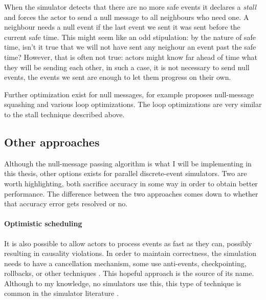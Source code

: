When the simulator detects that there are no more safe events it declares a \emph{stall} and forces the actor to send a null message to all neighbours who need one.
A neighbour needs a null event if the last event we sent it was sent before the current safe time.
This might seem like an odd stipulation: by the nature of safe time, isn't it true that we will not have sent any neighour an event past the safe time?
However, that is often not true: actors might know  far ahead of time what they will be sending each other, in such a case, it is not necessary to send null events, the events we sent are enough to let them progress on their own.

Further optimization exist for null messages, for example \cite{wang_enhanced_2016} proposes null-message squashing and various loop optimizations.
The loop optimizations are very similar to the stall technique described above.


\subsection{Other approaches}

Although the null-message passing algorithm  is what I will be implementing in this thesis, other options exists for parallel discrete-event simulators.
Two are worth highlighting, both sacrifice accuracy in some way in order to obtain better performance.
The difference between the two approaches comes down to whether that accuracy error gets resolved or no.

\paragraph{Optimistic scheduling} \label{optimistic-scheduling}
It is also possible to allow actors to process events as fast as they can, possibly resulting in causality violations.
In order to maintain correctness, the simulation needs to have a cancellation mechanism, some use anti-events, checkpointing, rollbacks, or other techniques \cite{fujimoto_parallel_2015}.
This hopeful approach is the source of its name. 
Although to my knowledge, no \datacenter simulators use this, this type of technique is common in the simulator literature \cite{jefferson_virtual_1985} . %

